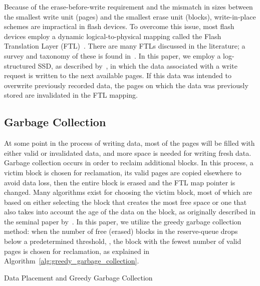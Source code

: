 \documentclass[prodmode,acmtos]{acmsmall}
\begin{document}
Because of the erase-before-write requirement and the mismatch in sizes between the smallest write unit (pages) and the smallest erase unit (blocks), write-in-place schemes are impractical in flash devices.  To overcome this issue, most flash devices employ a dynamic logical-to-physical mapping called the Flash Translation Layer (FTL)~\cite{chung2009survey,gupta2009dftl}.  There are many FTLs discussed in the literature; a survey and taxonomy of these is found in~\cite{chung2009survey}.  In this paper, we employ a log-structured SSD, as described by~, in which the data associated with a write request is written to the next available pages.  If this data was intended to overwrite previously recorded data, the pages on which the data was previously stored are invalidated in the FTL mapping.

\subsection{Garbage Collection}
At some point in the process of writing data, most of the pages will be filled with either valid or invalidated data, and more space is needed for writing fresh data. Garbage collection occurs in order to reclaim additional blocks.  In this process, a victim block is chosen for reclamation, its valid pages are copied elsewhere to avoid data loss, then the entire block is erased and the FTL map pointer is changed.  Many algorithms exist for choosing the victim block, most of which are based on either selecting the block that creates the most free space or one that also takes into account the age of the data on the block, as originally described in the seminal paper by~.  In this paper, we utilize the greedy garbage collection method: when the number of free (erased) blocks in the reserve-queue drops below a predetermined threshold, , the block with the fewest number of valid pages is chosen for reclamation, as explained in Algorithm~\ref{alg:greedy_garbage_collection}.


\begin{algorithm}[t]
\SetAlgoNoLine
{}

\caption{Data Placement and Greedy Garbage Collection}
\label{alg:greedy_garbage_collection}
\end{algorithm}
\end{document}
